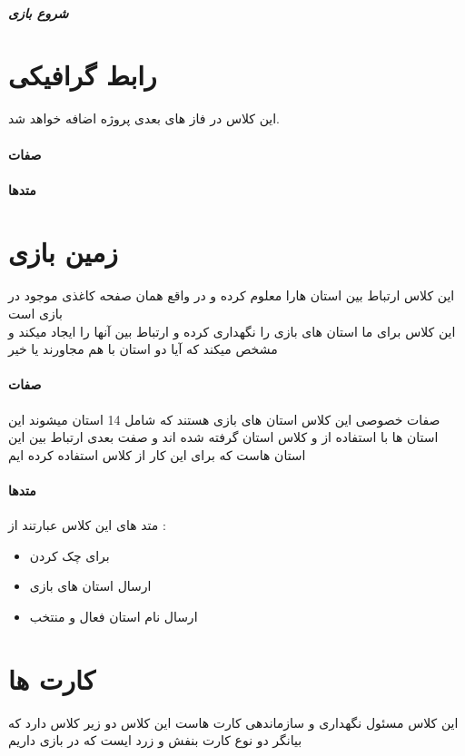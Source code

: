\documentclass[pdf,titlepage,a4paper]{report}
\begin{document}
	\subparagraph{شروع بازی}
	
	
	\newpage
	\section{رابط گرافیکی}
	 این کلاس در فاز های بعدی پروژه اضافه خواهد شد. \\
	\paragraph{صفات}
	\paragraph{متدها}


	\newpage
	\section{زمین بازی}
    این کلاس ارتباط بین استان هارا معلوم کرده و در واقع همان صفحه کاغذی موجود در بازی است \\
    این کلاس برای ما استان های بازی را نگهداری کرده و ارتباط بین آنها را ایجاد میکند و مشخص میکند که آیا دو استان با هم مجاورند یا خیر 

	\paragraph{صفات}
	صفات خصوصی این کلاس استان های بازی هستند که شامل 14 استان میشوند 
	این استان ها با استفاده از  و کلاس استان گرفته شده اند
	و صفت بعدی ارتباط بین این استان هاست که برای این کار از کلاس  استفاده کرده ایم
	\paragraph{متدها}
	
	متد های این کلاس عبارتند از :

		\begin{itemize}
			\item {} برای چک کردن 
			\item {} ارسال استان های بازی 
			\item {} ارسال نام استان فعال و منتخب
		\end{itemize}
	
	\newpage
	\section{کارت ها}
	این کلاس مسئول نگهداری و سازماندهی کارت هاست این کلاس دو زیر کلاس دارد که بیانگر دو نوع کارت بنفش و زرد ایست که در بازی داریم
\end{document}
